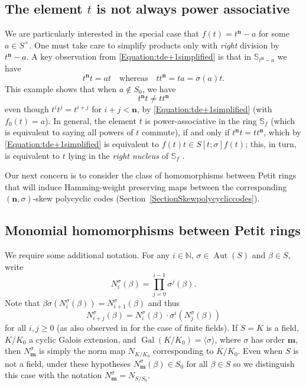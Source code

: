 \documentclass[11pt]{amsart}
\theoremstyle{plain}
\theoremstyle{definition}
\numberwithin{equation}{section}
\numberwithin{figure}{section}
\newcommand{\ring}{S}
\newcommand{\field}{K}
\newcommand{\Stsigma}{S[t;\sigma]}
\newcommand{\os}{\mathbf{m}}  %
\newcommand{\de}{\mathbf{n}}  %
\DeclareMathOperator{\Gal}{Gal}
\DeclareMathOperator{\Aut}{Aut}
\begin{document}
\subsection{The element $t$ is not always power associative}\label{S:associativity}

We are particularly interested in the special case that $f(t) = t^{\de}-a$ for some $a\in \ring^\times$.
One must take care to simplify products only with \emph{right} division by $t^{\de}-a$.
  A key observation from \eqref{Equation:tde+1simplified} is that in $\mathbb{S}_{t^\de-a}$ 
  we have
$$
t^{\de} t = a t \quad \text{whereas} \quad t t^{\de} = t a = \sigma(a) t.
$$
This example shows that when $a\not\in S_0$, we have
$$t^{\de} t\not= t t^{\de}$$
even though $t^it^j =  t^{i+j} $ for $i+j<\de$, by \eqref{Equation:tde+1simplified} %
(with $f_0(t)=a$).  In general, the element $t$ is power-associative in the ring $\mathbb{S}_f$  (which is equivalent to saying all powers of $t$ commute), if and only if $t^{\de} t= t t^{\de}$, which by \eqref{Equation:tde+1simplified}  is equivalent to $f(t)t\in \Stsigma f(t)$; this, in turn, is equivalent to $t$ lying in the \emph{right nucleus} of $\mathbb{S}_f$
  \cite[(5), p. 13-06]{Petit1967}.


Our next concern is to consider the class of homomorphisms between Petit rings that will induce Hamming-weight preserving maps between the corresponding $(\de,\sigma)$-skew polycyclic codes (Section~\ref{SectionSkewpolycycliccodes}).

\subsection{Monomial homomorphisms between Petit rings}
We require some additional notation.   For any $i\in \mathbb{N}$, $\sigma\in \Aut(\ring)$ and $\beta\in \ring$, write
$$
N_i^{\sigma}(\beta) = \prod_{j=0}^{i-1}\sigma^j(\beta).
$$
Note that $\beta \sigma(N_i^\sigma(\beta))=N_{i+1}^\sigma(\beta)$ and thus
\begin{equation}\label{E:Normrelation}
N_{i+j}^\sigma(\beta)= N_{i}^\sigma(\beta) \cdot \sigma^{i}(N_j^\sigma(\beta))
\end{equation}
for all $i,j\geq 0$ (as also observed in \cite[Proposition 2.1]{Cherchem2016} for the case of  finite fields).
If $\ring=\field$ is a field, $\field/\field_0$ a cyclic Galois extension, and $\Gal(\field/\field_0)=\langle \sigma \rangle$, where $\sigma$ has order $\os$, then  $N_{\os}^\sigma$ is simply the norm map $N_{\field/\field_0}$ corresponding to $\field/\field_0$.  Even when $S$ is not a field, under these hypotheses $N_{\os}^\sigma(\beta)\in \ring_0$ for all $\beta\in \ring$ so we distinguish this case with the notation
$N_{\os}^\sigma=N_{\ring/\ring_0}$.
\end{document}
